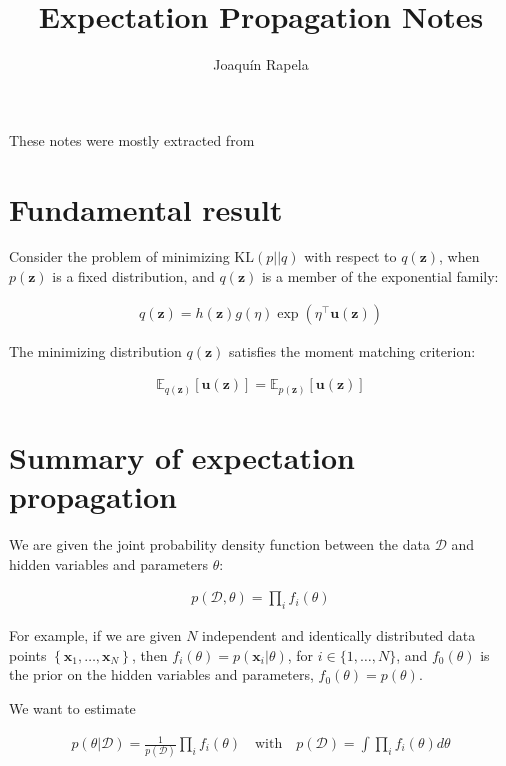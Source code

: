 \documentclass{article}
\title{Expectation Propagation Notes}
\author{Joaqu\'{i}n Rapela}
\begin{document}
\maketitle

These notes were mostly extracted from \citet{bishop06}

\section{Fundamental result}
\label{sec:fundamentalResult}

Consider the problem of minimizing $\text{KL}(p||q)$ with respect to $q(\mathbf{z})$,
when $p(\mathbf{z})$ is a fixed distribution, and $q(\mathbf{z})$ is a member of
the exponential family:

\begin{align*}
    q(\mathbf{z})=h(\mathbf{z})g(\eta)\exp(\eta^\intercal\mathbf{u}(\mathbf{z}))
\end{align*}

The minimizing distribution $q(\mathbf{z})$ satisfies the moment matching
criterion:

\begin{align*}
\mathbb{E}_{q(\mathbf{z})}\left[\mathbf{u}(\mathbf{z})\right]=\mathbb{E}_{p(\mathbf{z})}\left[\mathbf{u}(\mathbf{z})\right]
\end{align*}

\section{Summary of expectation propagation}

We are given the joint probability density function between the data
$\mathcal{D}$ and hidden variables and parameters $\theta$:

\begin{align*}
    p(\mathcal{D},\theta)=\prod_if_i(\theta)
\end{align*}

For example, if we are given $N$ independent and identically distributed data
points $\left\{\mathbf{x}_1,\ldots,\mathbf{x}_N\right\}$, then
$f_i(\theta)=p(\mathbf{x}_i|\theta)$, for $i\in\{1,\ldots,N\}$, and
$f_0(\theta)$ is the prior on the hidden variables and parameters,
$f_0(\theta)=p(\theta)$.

We want to estimate 

\begin{align}
    p(\theta|\mathcal{D})=\frac{1}{p(\mathcal{D})}\prod_if_i(\theta)\quad\text{with}\quad p(\mathcal{D})=\int\prod_if_i(\theta)d\theta
    \label{eq:truePoterior}
\end{align}
\end{document}
